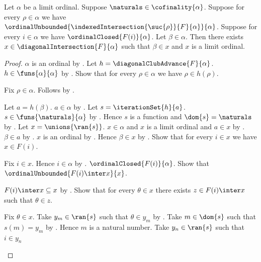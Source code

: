 \begin{theorem}\label{diagonal_clubs_have_common_limit_above}
    Let $\alpha$ be a limit ordinal.
    Suppose $\naturals\in\cofinality{\alpha}$.
    Suppose for every $\rho\in\alpha$ we have
        $\ordinalUnbounded{
            \indexedIntersection{\suc{\rho}}{F}{\alpha}}{\alpha}$.
    Suppose for every $i\in\alpha$ we have
        $\ordinalClosed{F(i)}{\alpha}$.
    Let $\beta\in\alpha$.
    Then there exists $x\in\diagonalIntersection{F}{\alpha}$ such that
        $\beta\in x$ and $x$ is a limit ordinal.
\end{theorem}
\begin{proof}
    $\alpha$ is an ordinal by .
    Let $h=\diagonalClubAdvance{F}{\alpha}$.
    $h\in\funs{\alpha}{\alpha}$
        by .
    Show that for every $\rho\in\alpha$ we have $\rho\in h(\rho)$.
    \begin{subproof}
        Fix $\rho\in\alpha$.
        Follows by .
    \end{subproof}
    Let $a=h(\beta)$.
    $a\in\alpha$ by .
    Let $s=\iterationSet{h}{a}$.
    $s\in\funs{\naturals}{\alpha}$
        by .
    Hence $s$ is a function and $\dom{s}=\naturals$
        by .
    Let $x=\unions{\ran{s}}$.
    $x\in\alpha$ and $x$ is a limit ordinal and $a\in x$
        by .
    $\beta\in a$ by .
    $x$ is an ordinal by .
    Hence $\beta\in x$ by .
    Show that for every $i\in x$ we have $x\in F(i)$.
    \begin{subproof}
        Fix $i\in x$.
        Hence $i\in\alpha$ by .
        $\ordinalClosed{F(i)}{\alpha}$.
        Show that $\ordinalUnbounded{F(i)\inter x}{x}$.
        \begin{subproof}
            $F(i)\inter x\subseteq x$ by .
            Show that for every $\theta\in x$ there exists
                $z\in F(i)\inter x$ such that $\theta\in z$.
            \begin{subproof}
                Fix $\theta\in x$.
                Take $y_m\in\ran{s}$ such that $\theta\in y_m$
                    by .
                Take $m\in\dom{s}$ such that $s(m)=y_m$
                    by .
                Hence $m$ is a natural number.
                Take $y_n\in\ran{s}$ such that $i\in y_n$

\end{subproof}
\end{subproof}
\end{subproof}
\end{proof}

